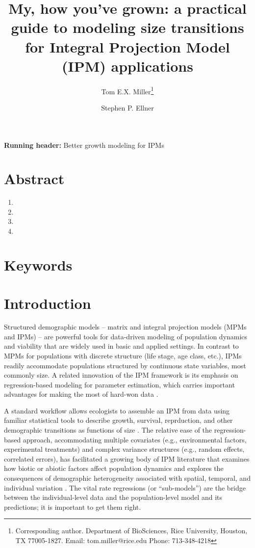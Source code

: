 \documentclass[12pt]{article}
\title{My, how you've grown: a practical guide to modeling size transitions for Integral Projection Model (IPM) applications}
\author[a]{Tom E.X. Miller\thanks{Corresponding author. Department of BioSciences, Rice University,
Houston, TX 77005-1827. Email: tom.miller@rice.edu Phone: 713-348-4218}}
\author[b]{Stephen P. Ellner}
\affil[a]{Department of BioSciences, Rice University, Houston, TX }
\affil[b]{Department of Ecology and Evolutionary Biology, Cornell University, Ithaca, New York}
\date{}
\begin{document}
\renewcommand{\baselinestretch}{1.25} 
\maketitle

\bigskip 
\noindent\textbf{Running header:} Better growth modeling for IPMs

\newpage
\linenumbers
\section*{Abstract} 
\begin{enumerate}
	\item 
	\item 
	\item 
	\item 
\end{enumerate}

\section*{Keywords}

\newpage
\section*{Introduction}

Structured demographic models -- matrix and integral projection models (MPMs and IPMs) -- are powerful tools for data-driven modeling of population dynamics and viability that are widely used in basic and applied settings. 
In contrast to MPMs for populations with discrete structure (life stage, age class, etc.), IPMs \citep{easterling2000size} readily accommodate populations structured by continuous state variables, most commonly size. 
A related innovation of the IPM framework is its emphasis on regression-based modeling for parameter estimation, which carries important advantages for making the most of hard-won data \citep{ellner2022critical}.  

A standard workflow allows ecologists to assemble an IPM from data using familiar statistical tools to describe growth, survival, reprduction, and other demographic transitions as functions of size \citep{Coulson:2012fk,ellner-etal-2016}. 
The relative ease of the regression-based approach, accommodating multiple covariates (e.g., environmental factors, experimental treatments) and complex variance structures (e.g., random effects, correlated errors), has facilitated a growing body of IPM literature that examines how biotic or abiotic factors affect population dynamics \citep[e.g.,][]{schultz2017native,ozgul2010coupled,louthan2022climate} and explores the consequences of demographic heterogeneity associated with spatial, temporal, and individual variation \citep[e.g.,][]{crone2016contrasting,compagnoni2016effect,plard2018sex}. 
The vital rate regressions (or ``sub-models'') are the bridge between the individual-level data and the population-level model and its predictions; it is important to get them right.
\end{document}
